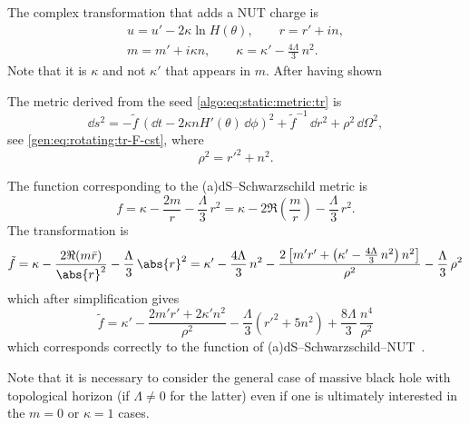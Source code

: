The complex transformation that adds a NUT charge is
\begin{subequations}
\label{ext:eq:change:jna-nut}
\begin{gather}
	u = u' - 2 \kappa \ln H(\theta), \qquad
	r = r' + i n, \\
	m = m' + i \kappa n, \qquad
	\kappa = \kappa' - \frac{4\Lambda}{3}\, n^2.
\end{gather}
\end{subequations}
Note that it is $\kappa$ and not $\kappa'$ that appears in $m$.
After having shown

The metric derived from the seed \eqref{algo:eq:static:metric:tr} is
\begin{equation}
	\dd s^2 = - \tilde f\, (\dd t - 2 \kappa n H'(\theta)\, \dd\phi)^2
		+ \tilde f^{-1}\, \dd r^2
		+ \rho^2\, \dd\Omega^2,
\end{equation}
see \eqref{gen:eq:rotating:tr-F-cst}, where
\begin{equation}
	\rho^2 = r'^2 + n^2.
\end{equation} 

The function corresponding to the (a)dS--Schwarzschild metric is
\begin{equation}
	f = \kappa - \frac{2m}{r} - \frac{\Lambda}{3}\, r^2
		= \kappa - 2 \Re\left(\frac{m}{r}\right) - \frac{\Lambda}{3}\, r^2.
\end{equation} 
The transformation is
\begin{equation}
	\tilde f = \kappa
			- \frac{2 \Re(m \bar r)}{\abs{r}^2}
			- \frac{\Lambda}{3}\, \abs{r}^2
		= \kappa' - \frac{4\Lambda}{3}\, n^2
			- \frac{2 \left[ m' r' + \left( \kappa' - \frac{4\Lambda}{3}\, n^2 \right) n^2 \right]}{\rho^2}
			- \frac{\Lambda}{3}\, \rho^2
\end{equation} 
which after simplification gives
\begin{equation}
	\label{ext:eq:nut-tilde-f}
	\tilde f = \kappa' - \frac{2 m' r' + 2 \kappa' n^2}{\rho^2}
		- \frac{\Lambda}{3} (r'^2 + 5 n^2)
		+ \frac{8\Lambda}{3}\, \frac{n^4}{\rho^2}
\end{equation} 
which corresponds correctly to the function of (a)dS--Schwarzschild--NUT~\cite{AlonsoAlberca:2000:SupersymmetryTopologicalKerrNewmannTaubNUTaDS}.

Note that it is necessary to consider the general case of massive black hole with topological horizon (if $\Lambda \neq 0$ for the latter) even if one is ultimately interested in the $m = 0$ or $\kappa = 1$ cases.

